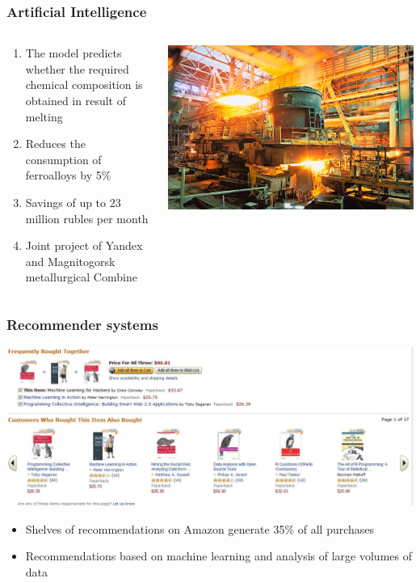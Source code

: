 \documentclass[default]{beamer}
\begin{document}
	\begin{frame}
		\frametitle{Artificial Intelligence}
		
		\begin{columns}
			\begin{column}{0.5\textwidth}
				\begin{enumerate}
					\item The model predicts whether the required chemical composition is obtained in 		result of melting
					\item Reduces the consumption of ferroalloys by 5\%
					\item Savings of up to 23 million rubles per month
					\item Joint project of Yandex and Magnitogorsk metallurgical Combine
				\end{enumerate}
				
			\end{column}
			\begin{column}{0.5\textwidth}
				\centering
				\includegraphics[width=\textwidth]{da_intro6.jpg}
			\end{column}
		\end{columns}

	\end{frame}

	\begin{frame}
		\frametitle{Recommender systems}
		
		\centering
		\includegraphics[width=\textwidth]{da_intro7.jpg}

		\begin{itemize}
			\item Shelves of recommendations on Amazon generate 35\% of all purchases
			\item Recommendations based on machine learning and analysis of large volumes of data
		\end{itemize}
	\end{frame}
\end{document}
